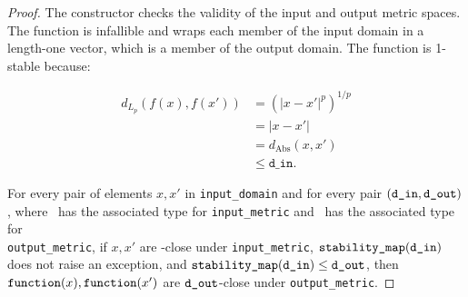 \documentclass{article}
\begin{document}
\begin{proof}
    The constructor checks the validity of the input and output metric spaces.
    The function is infallible and wraps each member of the input domain in a length-one vector,
    which is a member of the output domain.
    The function is 1-stable because:

    \begin{align}
        d_{L_p}(f(x), f(x'))
        &= \left(|x-x'|^p\right)^{1/p}\\
        &= |x-x'|\\
        &= d_{\mathrm{Abs}}(x,x')\\
        &\leq \texttt{d\_in}.
    \end{align}

    For every pair of elements $x, x'$ in \texttt{input\_domain} and for every pair $(\texttt{d\_in}, \texttt{d\_out})$,
    where \din\ has the associated type for \texttt{input\_metric} and \dout\ has the associated type for \\ \texttt{output\_metric},
    if $x, x'$ are \din-close under \texttt{input\_metric}, $\texttt{stability\_map}(\texttt{d\_in})$ does not raise an exception,
    and $\texttt{stability\_map}(\texttt{d\_in}) \leq \texttt{d\_out}$,
    then $\texttt{function}(x), \texttt{function}(x')$ are $\texttt{d\_out}$-close under \texttt{output\_metric}.
\end{proof}
\end{document}
